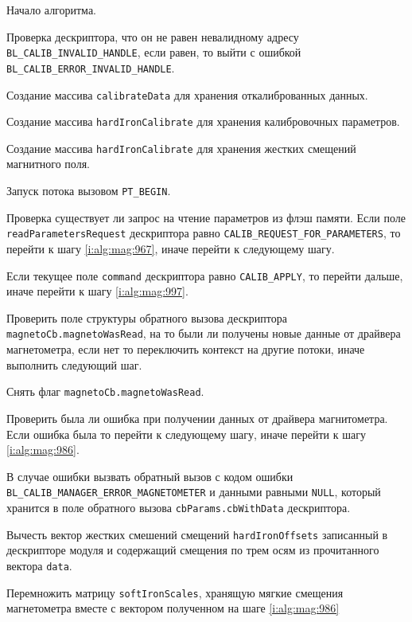 \begin{enumerate_step}
    \item Начало алгоритма.
    \item Проверка дескриптора, что он не равен невалидному адресу \lstinline|BL_CALIB_INVALID_HANDLE|, если равен, то выйти с ошибкой
    \lstinline|BL_CALIB_ERROR_INVALID_HANDLE|.
    \item Создание массива \lstinline|calibrateData| для хранения откалиброванных данных.
    \item Создание массива \lstinline|hardIronCalibrate| для хранения калибровочных параметров.
    \item Создание массива \lstinline|hardIronCalibrate| для хранения жестких смещений магнитного поля.
    \item Запуск потока вызовом \lstinline|PT_BEGIN|.
    \item \label{i:alg:mag:965} Проверка существует ли запрос на чтение параметров из флэш памяти. Если поле \lstinline|readParametersRequest| дескриптора равно \lstinline|CALIB_REQUEST_FOR_PARAMETERS|,
    то перейти к шагу \ref{i:alg:mag:967}, иначе перейти к следующему шагу.
    \item \label{i:alg:mag:974} Если текущее поле \lstinline|command| дескриптора равно \lstinline|CALIB_APPLY|, то перейти дальше, иначе перейти к шагу
    \ref{i:alg:mag:997}.
    \item Проверить поле структуры обратного вызова дескриптора \lstinline|magnetoCb.magnetoWasRead|, на то были ли получены новые данные от драйвера магнетометра, 
    если нет то переключить контекст на другие потоки, иначе выполнить следующий шаг.
    \item Снять флаг \lstinline|magnetoCb.magnetoWasRead|.
    \item Проверить была ли ошибка при получении данных от драйвера магнитометра. Если ошибка была то перейти к следующему шагу, иначе перейти к шагу \ref{i:alg:mag:986}.
    \item В случае ошибки вызвать обратный вызов с кодом ошибки \lstinline|BL_CALIB_MANAGER_ERROR_MAGNETOMETER| и данными равными \lstinline|NULL|,
    который хранится в поле обратного вызова \lstinline|cbParams.cbWithData| дескриптора.
    \item \label{i:alg:mag:986} Вычесть вектор жестких смешений смещений \lstinline|hardIronOffsets| записанный в дескрипторе модуля и содержащий смещения по трем осям из прочитанного вектора \lstinline|data|.
    \item \label{i:alg:mag:991} Перемножить матрицу \lstinline|softIronScales|, хранящую мягкие смещения магнетометра вместе с вектором полученном на шаге \ref{i:alg:mag:986}

\end{enumerate_step}
